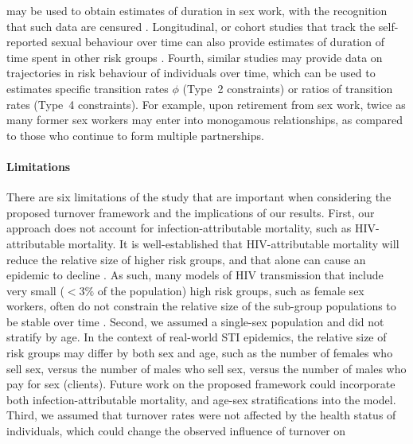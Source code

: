 may be used to obtain estimates of duration in sex work,
with the recognition that such data are censured \citep{Watts2010}.
Longitudinal, or cohort studies
that track the self-reported sexual behaviour over time can also provide 
estimates of duration of time spent in other risk groups \citep{Fergus2007}.
Fourth, similar studies may provide data on
trajectories in risk behaviour of individuals over time,
which can be used to estimates specific transition rates $\phi$ (Type~2 constraints)
or ratios of transition rates (Type~4 constraints).
For example, upon retirement from sex work,
twice as many former sex workers may enter into monogamous relationships,
as compared to those who continue to form multiple partnerships.
\paragraph{Limitations}
There are six limitations of the study that are important when considering
the proposed turnover framework and the implications of our results.
First, our approach does not account for
infection-attributable mortality, such as HIV-attributable mortality.
It is well-established that HIV-attributable mortality will reduce the 
relative size of higher risk groups,
and that alone can cause an epidemic to decline \citep{Boily1997}.
As such, many models of HIV transmission
that include very small ($<3\%$ of the population)
high risk groups, such as female sex workers,
often do not constrain the relative size
of the sub-group populations to be stable over time
\citep{Pickles2013}.
Second, we assumed a single-sex population and did not stratify by age.
In the context of real-world STI epidemics,
the relative size of risk groups may differ
by both sex and age,
such as the number of females who sell sex,
versus the number of males who sell sex,
versus the number of males who pay for sex (clients).
Future work on the proposed framework could incorporate both
infection-attributable mortality, and age-sex stratifications into the model.
Third, we assumed that turnover rates were not affected by
the health status of individuals,
which could change the observed influence of turnover on
